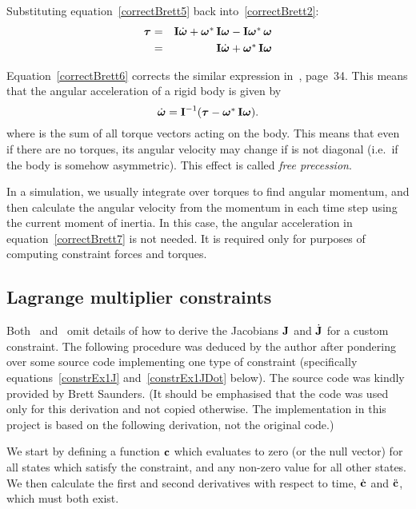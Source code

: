 Substituting equation~\ref{correctBrett5} back into~\ref{correctBrett2}:
\begin{eqnarray}
\ve{\tau} & = & \m{I}\dot{\ve{\omega}} + \dual{\ve{\omega}}\,\m{I}\ve{\omega} -
    \m{I}\dual{\ve{\omega}}\,\ve{\omega} \nonumber \\
& = & \m{I}\dot{\ve{\omega}} + \dual{\ve{\omega}}\,\m{I}\ve{\omega} \label{correctBrett6}
\end{eqnarray}

Equation~\ref{correctBrett6} corrects the similar expression in~\cite{Saunders:PhD},
page~34. This means that the angular acceleration of a rigid body is given by
\begin{equation}
\label{correctBrett7}
\dot{\ve{\omega}} = \m{I}^{-1} (\ve{\tau} - \dual{\ve{\omega}}\,\m{I}\ve{\omega}).
\end{equation}
where \ve{\tau} is the sum of all torque vectors acting on the body. This means that even if
there are no torques, its angular velocity may change if  is not diagonal (i.e.\ if
the body is somehow asymmetric). This effect is called \emph{free precession}.

In a simulation, we usually integrate over torques to find angular momentum, and then calculate
the angular velocity from the momentum in each time step using the current moment of inertia. In
this case, the angular acceleration in equation~\ref{correctBrett7} is not needed. It is required
only for purposes of computing constraint forces and torques.


\subsection{Lagrange multiplier constraints}

Both~\cite{BaraffWitkin:97} and~\cite{Saunders:PhD} omit details of how to derive the Jacobians
$\m{J}$ and $\dot{\m{J}}$ for a custom constraint. The following procedure was deduced
by the author after pondering over some source code implementing one type of constraint
(specifically equations~\ref{constrEx1J} and~\ref{constrEx1JDot} below). The source code
was kindly provided by Brett Saunders. (It should be emphasised that the code was used only
for this derivation and not copied otherwise. The implementation in this project is based
on the following derivation, not the original code.)

We start by defining a function $\ve{c}$ which evaluates to zero (or the null vector) for
all states which satisfy the constraint, and any non-zero value for all other states. 
We then calculate the first and second derivatives with respect to time, $\dot{\ve{c}}$
and $\ddot{\ve{c}}$, which must both exist.

